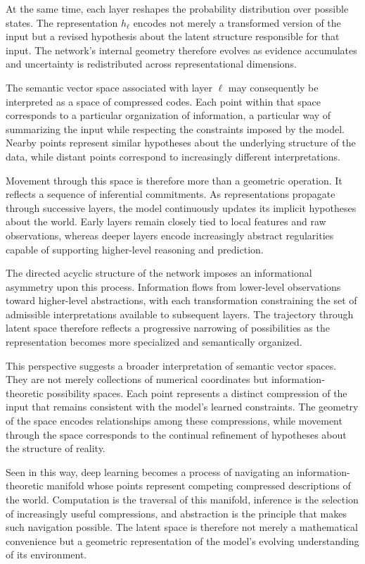 \documentclass[12pt,letterpaper]{article}
\theoremstyle{remark}
\begin{document}
At the same time, each layer reshapes the probability distribution over possible states. The representation $h_\ell$ encodes not merely a transformed version of the input but a revised hypothesis about the latent structure responsible for that input. The network's internal geometry therefore evolves as evidence accumulates and uncertainty is redistributed across representational dimensions.

The semantic vector space associated with layer $\ell$ may consequently be interpreted as a space of compressed codes. Each point within that space corresponds to a particular organization of information, a particular way of summarizing the input while respecting the constraints imposed by the model. Nearby points represent similar hypotheses about the underlying structure of the data, while distant points correspond to increasingly different interpretations.

Movement through this space is therefore more than a geometric operation. It reflects a sequence of inferential commitments. As representations propagate through successive layers, the model continuously updates its implicit hypotheses about the world. Early layers remain closely tied to local features and raw observations, whereas deeper layers encode increasingly abstract regularities capable of supporting higher-level reasoning and prediction.

The directed acyclic structure of the network imposes an informational asymmetry upon this process. Information flows from lower-level observations toward higher-level abstractions, with each transformation constraining the set of admissible interpretations available to subsequent layers. The trajectory through latent space therefore reflects a progressive narrowing of possibilities as the representation becomes more specialized and semantically organized.

This perspective suggests a broader interpretation of semantic vector spaces. They are not merely collections of numerical coordinates but information-theoretic possibility spaces. Each point represents a distinct compression of the input that remains consistent with the model's learned constraints. The geometry of the space encodes relationships among these compressions, while movement through the space corresponds to the continual refinement of hypotheses about the structure of reality.

Seen in this way, deep learning becomes a process of navigating an information-theoretic manifold whose points represent competing compressed descriptions of the world. Computation is the traversal of this manifold, inference is the selection of increasingly useful compressions, and abstraction is the principle that makes such navigation possible. The latent space is therefore not merely a mathematical convenience but a geometric representation of the model's evolving understanding of its environment.
\end{document}
